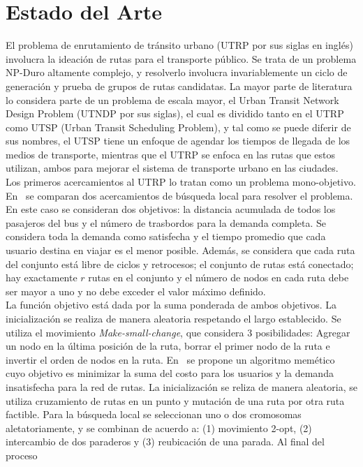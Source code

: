 \section{Estado del Arte}
El problema de enrutamiento de tr\'ansito urbano (UTRP por sus siglas en ingl\'es) involucra la ideaci\'on de rutas para el transporte p\'ublico.
Se trata de un problema NP-Duro altamente complejo, y resolverlo involucra invariablemente un ciclo de
generaci\'on y prueba de grupos de rutas candidatas. La mayor parte de literatura lo considera parte de un problema de escala mayor, el Urban Transit Network Design Problem (UTNDP por sus siglas),
el cual es dividido tanto en el UTRP como UTSP (Urban Transit Scheduling Problem), y tal como se puede diferir de sus nombres, el UTSP
tiene un enfoque de agendar los tiempos de llegada de los medios de transporte, mientras que el UTRP se enfoca en las rutas que estos
utilizan, ambos para mejorar el sistema de transporte urbano en las ciudades.\\
Los primeros acercamientos al UTRP lo tratan como un problema mono-objetivo. En~\cite{metaheuristic2010} se
comparan dos acercamientos de b\'usqueda local para resolver el problema. En este
caso se consideran dos objetivos: la distancia acumulada de todos los pasajeros
del bus y el n\'umero de trasbordos para la demanda completa. Se considera toda la demanda como satisfecha y el tiempo
promedio que cada usuario destina en viajar es
el menor posible. Adem\'as, se considera que cada ruta del conjunto est\'a libre de ciclos y retrocesos;
el conjunto de rutas est\'a conectado; hay exactamente $r$ rutas en el conjunto y el n\'umero de nodos en cada
ruta debe ser mayor a uno y no debe exceder el valor m\'aximo definido. \\
La funci\'on objetivo est\'a dada por la suma ponderada de ambos objetivos.
La inicializaci\'on se realiza de manera aleatoria respetando el largo establecido. Se
utiliza el movimiento \emph{Make-small-change}, que considera 3 posibilidades: Agregar un nodo en
la \'ultima posici\'on de la ruta, borrar el primer nodo de la ruta e invertir el orden de nodos en la ruta.
En~\cite{memetic2011} se propone un algoritmo mem\'etico cuyo objetivo es minimizar la suma del costo
para los usuarios y la demanda insatisfecha para la red de rutas. La inicializaci\'on se reliza
de manera aleatoria, se utiliza cruzamiento de rutas en un punto y mutaci\'on de una ruta por otra ruta factible. Para
la b\'usqueda local se seleccionan uno o dos cromosomas aletatoriamente, y se combinan de acuerdo a: (1) 
movimiento 2-opt, (2) intercambio de dos paraderos y (3) reubicaci\'on de una parada. Al final del proceso
